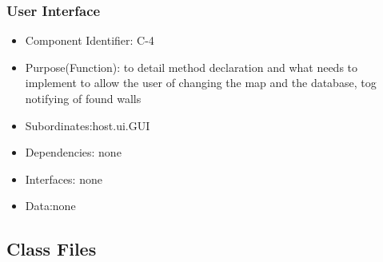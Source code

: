 \documentclass[11pt, a4paper]{report}
\begin{document}
\subsubsection{User Interface}
\begin{itemize}
\item Component Identifier: C-4
\item Purpose(Function): to detail method declaration and what needs to implement
 to allow the user of changing the map and the database, tog notifying of found walls
\item Subordinates:host.ui.GUI
\item Dependencies: none
\item Interfaces: none
\item Data:none
\end{itemize}
\subsection{Class Files}
\end{document}
